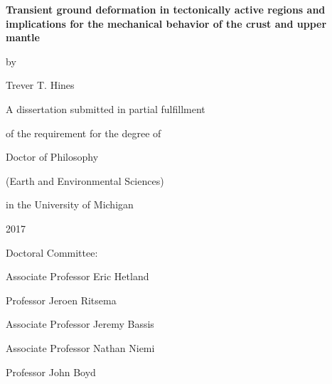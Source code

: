 \documentclass[leqno,12pt]{report}
\begin{document}
\begin{titlepage}
\begin{center}
\vspace*{1.0in}
\textbf{\large{Transient ground deformation in tectonically active regions and implications for the mechanical behavior of the crust and upper mantle}}

\vspace*{0.25in}
by

\vspace*{0.25in}
Trever T. Hines 

\vspace*{2.0in}
A dissertation submitted in partial fulfillment

of the requirement for the degree of 

Doctor of Philosophy

(Earth and Environmental Sciences)

in the University of Michigan

2017
\end{center}
\vspace*{1.0in}
Doctoral Committee:

\vspace*{0.1in}
\hspace*{0.2in}
Associate Professor Eric Hetland

\hspace*{0.2in}
Professor Jeroen Ritsema

\hspace*{0.2in}
Associate Professor Jeremy Bassis

\hspace*{0.2in}
Associate Professor Nathan Niemi

\hspace*{0.2in}
Professor John Boyd
\end{titlepage}
\end{document}
